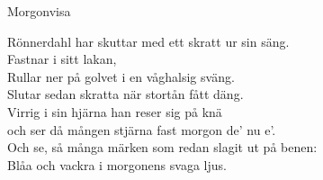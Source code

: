 \begin{song}{Morgonvisa}

	
	
	Rönnerdahl har skuttar med ett skratt ur sin säng.\\
	Fastnar i sitt lakan, \\
	Rullar ner på golvet i en våghalsig sväng.\\
	Slutar sedan skratta när stortån fått däng.\\
	Virrig i sin hjärna han reser sig på knä\\
	och ser då mången stjärna fast morgon de' nu e'.\\
	Och se, så många märken som redan slagit ut på benen:\\
	Blåa och vackra i morgonens svaga ljus.
	
\end{song}
